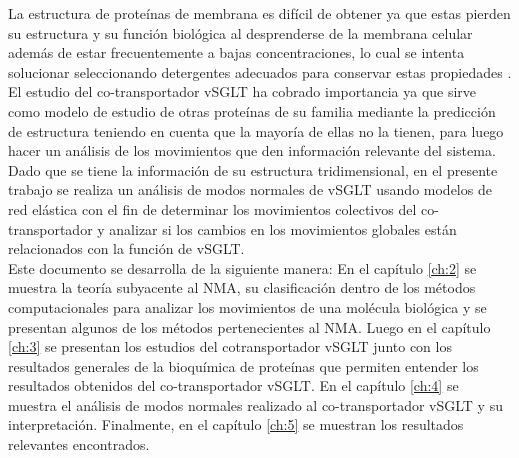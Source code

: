 La estructura de prote\'{i}nas de membrana es dif\'{i}cil de obtener ya que estas pierden su estructura y su funci\'{o}n biol\'{o}gica al desprenderse de la membrana celular adem\'{a}s de estar frecuentemente a bajas concentraciones, lo cual se intenta solucionar seleccionando detergentes adecuados para conservar estas propiedades \cite{Editor2010}.\\

El estudio del co-transportador vSGLT ha cobrado importancia ya que sirve como modelo de estudio de otras prote\'{i}nas de su familia mediante la predicci\'{o}n de estructura teniendo en cuenta que la mayor\'{i}a de ellas no la tienen, para luego hacer un an\'{a}lisis de los movimientos que den informaci\'{o}n relevante del sistema.\\

Dado que se tiene la informaci\'{o}n de su estructura tridimensional, en el  presente trabajo se realiza un an\'{a}lisis de modos normales de vSGLT usando modelos de red el\'{a}stica con el fin de determinar los movimientos colectivos del co-transportador y analizar si los cambios en los movimientos globales est\'{a}n relacionados con la funci\'{o}n de vSGLT.\\

Este documento se desarrolla de la siguiente manera: En el cap\'{i}tulo \ref{ch:2} se muestra la teor\'{i}a subyacente al NMA, su clasificaci\'{o}n dentro de los m\'{e}todos computacionales para analizar los movimientos de una mol\'{e}cula biol\'{o}gica y se presentan algunos de los m\'{e}todos pertenecientes al NMA. Luego en el cap\'{i}tulo \ref{ch:3} se presentan los estudios del cotransportador vSGLT junto con los resultados generales de la bioqu\'{i}mica de prote\'{i}nas que permiten entender los resultados obtenidos del co-transportador vSGLT. En el cap\'{i}tulo \ref{ch:4} se muestra el an\'{a}lisis de modos normales realizado al co-transportador vSGLT y su interpretaci\'{o}n. Finalmente, en el cap\'{i}tulo \ref{ch:5} se muestran los resultados relevantes encontrados.\\
